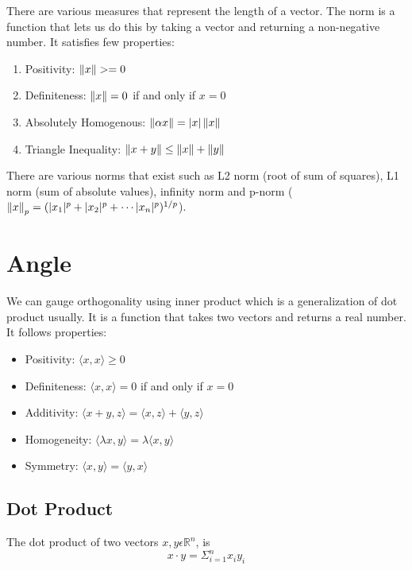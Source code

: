 There are various measures that represent the length of a vector. The norm is a function that lets us do this by taking a vector and returning a non-negative number. It satisfies few properties:

\begin{enumerate}
    \item Positivity: $\left\lVert x\right\rVert >= 0$
    \item Definiteness: $\left\lVert x\right\rVert = 0$ if and only if $x=0$
    \item Absolutely Homogenous: $\left\lVert\alpha x\right\rVert = \lvert x\rvert \left\lVert x\right\rVert$
    \item Triangle Inequality: $\left\lVert x + y\right\rVert \leq \left\lVert x\right\rVert + \left\lVert y\right\rVert$
\end{enumerate}

There are various norms that exist such as L2 norm (root of sum of squares), L1 norm (sum of absolute values), infinity norm and p-norm ($\left\lVert x\right\rVert_p = (\lvert x_1\rvert^p + \lvert x_2\rvert^p + \cdots \lvert x_n\rvert^p)^{1/p}$).

\section{Angle}

We can gauge orthogonality using inner product which is a generalization of dot product usually. It is a function that takes two vectors and returns a real number. It follows properties:

\begin{itemize}
    \item Positivity: $\langle x, x \rangle \geq 0$
    \item Definiteness: $\langle x, x \rangle = 0$ if and only if $x = 0$
    \item Additivity: $\langle x+y, z \rangle = \langle x, z \rangle + \langle y, z \rangle$
    \item Homogeneity: $\langle \lambda x, y \rangle = \lambda \langle x,y \rangle$
    \item Symmetry: $\langle x, y \rangle = \langle y, x \rangle$
\end{itemize}

\subsection{Dot Product}

The dot product of two vectors $x, y \epsilon \mathbb{R}^n$, is 
\begin{equation}
x \cdot y = \Sigma_{i=1}^{n} x_i y_i
\end{equation}

